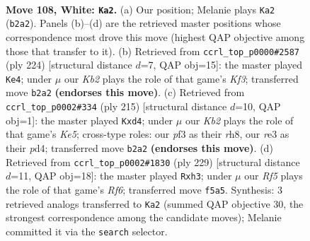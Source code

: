 \documentclass[11pt]{article}
\begin{document}
\clearpage

\begin{figure}[p]\centering
\begin{subfigure}{0.46\textwidth}\centering
\resizebox{\linewidth}{!}{%
\newchessgame
\chessboard[
  setfen={1B5k/8/8/5R1P/8/4rp2/1K6/8 w - - 8 108},
  showmover=false,
  pgfstyle=straightmove, color=movearrow, markmove={b2-a2}
]}
\caption{}
\end{subfigure}\hfill
\begin{subfigure}{0.46\textwidth}\centering
\resizebox{\linewidth}{!}{%
\newchessgame
\chessboard[
  setfen={8/6k1/3PR2p/7r/8/5K2/8/8 w - - 1 113},
  showmover=false,
  pgfstyle=straightmove, color=movearrow, markmove={f3-e4}
]}
\caption{}
\end{subfigure}
\\[4pt]
\begin{subfigure}{0.46\textwidth}\centering
\resizebox{\linewidth}{!}{%
\newchessgame
\chessboard[
  setfen={7R/8/8/8/2pPk3/8/2r5/4K3 b - - 7 108},
  showmover=false,
  pgfstyle=straightmove, color=movearrow, markmove={e4-d4}
]}
\caption{}
\end{subfigure}\hfill
\begin{subfigure}{0.46\textwidth}\centering
\resizebox{\linewidth}{!}{%
\newchessgame
\chessboard[
  setfen={8/6k1/6p1/3K4/8/5r1P/R7/8 b - - 15 115},
  showmover=false,
  pgfstyle=straightmove, color=movearrow, markmove={f3-h3}
]}
\caption{}
\end{subfigure}
\caption{\textbf{Move 108, White: \texttt{Ka2}.} (a) Our position; Melanie plays \texttt{Ka2} (\texttt{b2a2}). Panels (b)--(d) are the retrieved master positions whose correspondence most drove this move (highest QAP objective among those that transfer to it). (b) Retrieved from \texttt{ccrl\_top\_p0000\#2587} (ply 224) [structural distance $d$=7, QAP obj=15]: the master played \texttt{Ke4}; under $\mu$ our \emph{Kb2} plays the role of that game's \emph{Kf3}; transferred move \texttt{b2a2} \textbf{(endorses this move)}. (c) Retrieved from \texttt{ccrl\_top\_p0002\#334} (ply 215) [structural distance $d$=10, QAP obj=1]: the master played \texttt{Kxd4}; under $\mu$ our \emph{Kb2} plays the role of that game's \emph{Ke5}; cross-type roles: our \emph{p}f3 as their \emph{r}h8, our \emph{r}e3 as their \emph{p}d4; transferred move \texttt{b2a2} \textbf{(endorses this move)}. (d) Retrieved from \texttt{ccrl\_top\_p0002\#1830} (ply 229) [structural distance $d$=11, QAP obj=18]: the master played \texttt{Rxh3}; under $\mu$ our \emph{Rf5} plays the role of that game's \emph{Rf6}; transferred move \texttt{f5a5}. Synthesis: 3 retrieved analogs transferred to \texttt{Ka2} (summed QAP objective 30, the strongest correspondence among the candidate moves); Melanie committed it via the \texttt{search} selector.}
\label{fig:thought-m214}
\end{figure}
\end{document}
